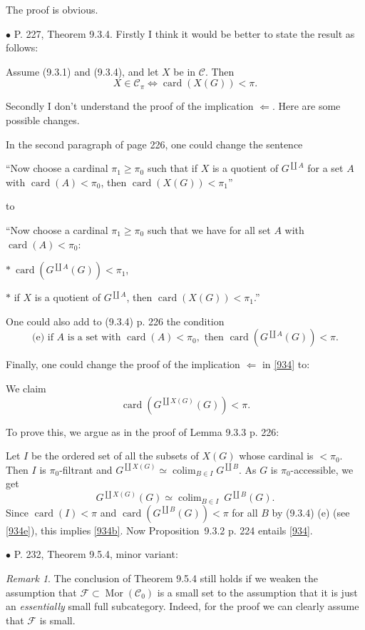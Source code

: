 \documentclass[12pt]{article}
\theoremstyle{remark}
\newtheorem{rk}[thm]{Remark}
\newcommand{\bu}{\bullet}
\newcommand{\n}{\noindent}
\newcommand{\cc}{\mathcal}
\newcommand{\C}{\mathcal C}
\newcommand{\be}{\begin{equation}}
\newcommand{\ee}{\end{equation}}
\DeclareMathOperator*{\co}{colim}
\DeclareMathOperator{\ca}{card}
\DeclareMathOperator{\card}{card}
\DeclareMathOperator{\Mor}{Mor}
\begin{document}
The proof is obvious. 



\n$\bu$ P. 227, Theorem 9.3.4. Firstly I think it would be better to state the result as follows:

Assume (9.3.1) and (9.3.4), and let $X$ be in $\C$. Then 
\be\label{934}
X\in\C_\pi\iff\ca(X(G))<\pi.
\ee 

Secondly I don't understand the proof of the implication $\Leftarrow$. Here are some possible changes. 

In the second paragraph of page 226, one could change the sentence 

``Now choose a cardinal $\pi_1\ge\pi_0$ such that if $X$ is a quotient of $G^{\coprod A}$ for a set $A$ with $\ca(A)<\pi_0$, then $\ca(X(G))<\pi_1$''

\n to 

``Now choose a cardinal $\pi_1\ge\pi_0$ such that we have for all set $A$ with $\ca(A)<\pi_0$: 

$*\ \ca(G^{\coprod A}(G))<\pi_1$, 

$*$ if $X$ is a quotient of $G^{\coprod A}$, then $\ca(X(G))<\pi_1$.'' 

One could also add to (9.3.4) p. 226 the condition 
\be\label{934e}
\text{(e) if }A\text{ is a set with }\ca(A)<\pi_0,\text{ then }\ca(G^{\coprod A}(G))<\pi.
\ee

Finally, one could change the proof of the implication $\Leftarrow$ in \eqref{934} to: 

We claim  
\be\label{934b}
\ca(G^{\coprod X(G)}(G))<\pi.
\ee 

To prove this, we argue as in the proof of Lemma 9.3.3 p. 226: 

Let $I$ be the ordered set of all the subsets of $X(G)$ whose cardinal is $<\pi_0$. Then $I$ is $\pi_0$-filtrant and $G^{\coprod X(G)}\simeq\co_{B\in I}G^{\coprod B}$. As $G$ is $\pi_0$-accessible, we get 
$$
G^{\coprod X(G)}(G)\simeq\co_{B\in I}\ G^{\coprod B}(G).
$$ 
Since $\ca(I)<\pi$ and $\ca(G^{\coprod B}(G))<\pi$ for all $B$ by (9.3.4) (e) (see \eqref{934e}), this implies \eqref{934b}. Now Proposition~9.3.2 p. 224 entails \eqref{934}. 


\n$\bu$ P. 232, Theorem 9.5.4, minor variant: 
\begin{rk}\label{954}
The conclusion of Theorem 9.5.4 still holds if we weaken the assumption that $\cc F\subset\Mor(\C_0)$ is a small set to the assumption that it is just an {\em essentially} small full subcategory. Indeed, for the proof we can clearly assume that $\cc F$ is small. 
\end{rk}
\end{document}
